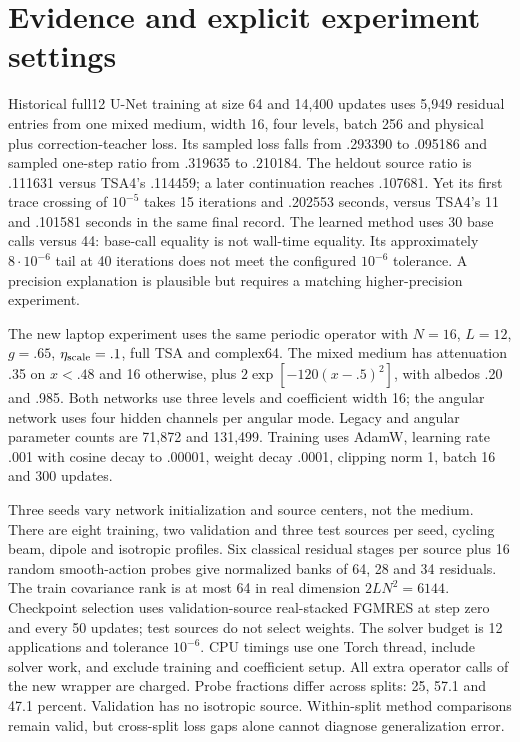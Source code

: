 \documentclass[11pt]{article}
\begin{document}
\section{Evidence and explicit experiment settings}
Historical full12 U-Net training at size 64 and 14,400 updates uses 5,949
residual entries from one mixed medium, width 16, four levels, batch 256 and
physical plus correction-teacher loss. Its sampled loss falls from .293390
to .095186 and sampled one-step ratio from .319635 to .210184. The heldout
source ratio is .111631 versus TSA4's .114459; a later continuation reaches
.107681. Yet its first trace crossing of $10^{-5}$ takes 15 iterations and
.202553 seconds, versus TSA4's 11 and .101581 seconds in the same final record.
The learned method uses 30 base calls versus 44: base-call equality is not
wall-time equality. Its approximately $8\cdot10^{-6}$ tail at 40 iterations
does not meet the configured $10^{-6}$ tolerance. A precision explanation is
plausible but requires a matching higher-precision experiment.

The new laptop experiment uses the same periodic operator with $N=16$, $L=12$,
$g=.65$, $\eta_{\rm scale}=.1$, full TSA and complex64. The mixed medium has
attenuation .35 on $x<.48$ and 16 otherwise, plus
$2\exp[-120(x-.5)^2]$, with albedos .20 and .985. Both networks use three
levels and coefficient width 16; the angular network uses four hidden channels
per angular mode. Legacy and angular parameter counts are 71,872 and 131,499.
Training uses AdamW, learning rate .001 with cosine decay to .00001, weight
decay .0001, clipping norm 1, batch 16 and 300 updates.

Three seeds vary network initialization and source centers, not the medium.
There are eight training, two validation and three test sources per seed,
cycling beam, dipole and isotropic profiles. Six classical residual stages
per source plus 16 random smooth-action probes give normalized banks of
64, 28 and 34 residuals. The train covariance rank is at most 64 in real
dimension $2L N^2=6144$. Checkpoint selection uses validation-source real-stacked
FGMRES at step zero and every 50 updates; test sources do not select weights.
The solver budget is 12 applications and tolerance $10^{-6}$. CPU timings use
one Torch thread, include solver work, and exclude training and coefficient
setup. All extra operator calls of the new wrapper are charged.
Probe fractions differ across splits: 25, 57.1 and 47.1 percent. Validation
has no isotropic source. Within-split method comparisons remain valid, but
cross-split loss gaps alone cannot diagnose generalization error.
\end{document}
